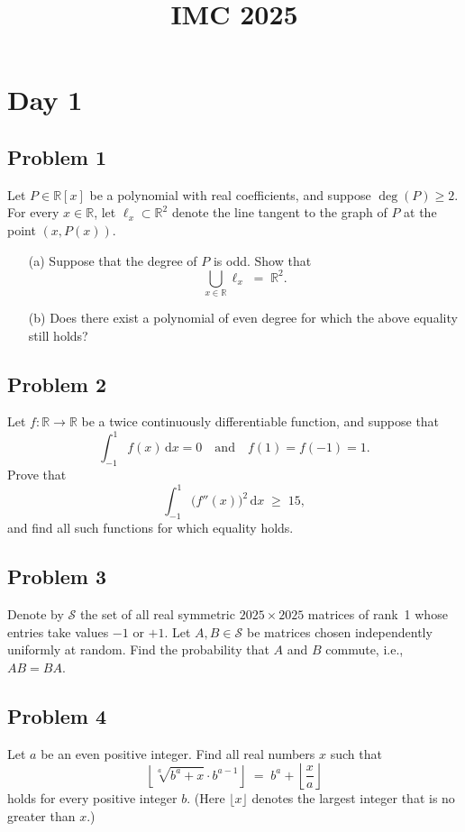 \documentclass{article}
\title{IMC 2025}
\author{}
\date{}
\begin{document}
    \maketitle

    \section*{Day 1}

    \subsection*{Problem 1}
    Let $P \in \mathbb{R}[x]$ be a polynomial with real coefficients, and suppose $\deg(P)\ge2$. For every $x\in\mathbb{R}$, let $\ell_x\subset\mathbb{R}^2$ denote the line tangent to the graph of $P$ at the point $(x,P(x))$.

    \begin{enumerate}
        \item[(a)] Suppose that the degree of $P$ is odd. Show that
        \[
            \bigcup_{x\in\mathbb{R}}\ell_x \;=\; \mathbb{R}^2.
        \]
        \item[(b)] Does there exist a polynomial of even degree for which the above equality still holds?
    \end{enumerate}

    \subsection*{Problem 2}
    Let $f:\mathbb{R}\to\mathbb{R}$ be a twice continuously differentiable function, and suppose that
    \[
        \int_{-1}^{1} f(x)\,\mathrm{d}x = 0
        \quad\text{and}\quad
        f(1) = f(-1) = 1.
    \]
    Prove that
    \[
        \int_{-1}^{1} \bigl(f''(x)\bigr)^2 \,\mathrm{d}x \;\ge\; 15,
    \]
    and find all such functions for which equality holds.

    \subsection*{Problem 3}
    Denote by $\mathcal{S}$ the set of all real symmetric $2025\times2025$ matrices of rank~1 whose entries take values $-1$ or $+1$. Let $A,B\in\mathcal{S}$ be matrices chosen independently uniformly at random. Find the probability that $A$ and $B$ commute, i.e., $AB = BA$.

    \subsection*{Problem 4}
    Let $a$ be an even positive integer. Find all real numbers $x$ such that
    \[
        \left\lfloor \sqrt[a]{b^a + x} \cdot b^{a-1} \right\rfloor
        \;=\; b^a + \left\lfloor \frac{x}{a} \right\rfloor
    \]
    holds for every positive integer $b$.
    (Here $\lfloor x\rfloor$ denotes the largest integer that is no greater than $x$.)
\end{document}
